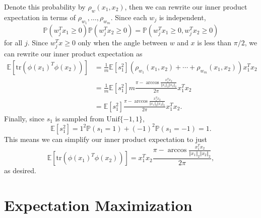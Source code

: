 \documentclass{article}
\newcommand{\tr}{\text{tr}}
\begin{document}
Denote this probability by $\rho_w(x_1,x_2)$, then we can rewrite our inner product expectation in terms of $\rho_{w_1}, \dots, \rho_{w_m}$. Since each $w_j$ is independent, \[\mathbb{P}(w_j^T x_1\geq 0) \mathbb{P}(w_j^Tx_2\geq 0) = \mathbb{P}(w_j^T x_1 \geq 0, w_j^T x_2 \geq 0)\] for all $j$. Since $w_j^T x \geq 0$ only when the angle between $w$ and $x$ is less than $\pi/2$, we can rewrite our inner product expectation as
\begin{align*}
	\mathbb{E}\left[ \tr(\phi(x_1)^T \phi(x_2)) \right] &= \frac{1}{m} \mathbb{E}[s_1^2] \left( \rho_{w_1}(x_1,x_2) + \cdots + \rho_{w_m}(x_1,x_2) \right) x_1^T x_2 \\
							    &= \frac{1}{m} \mathbb{E}[s_1^2]m \frac{\pi - \arccos \frac{x_1^T x_2}{\Vert{x_1}\Vert_2 \Vert{x_2}\Vert_2}}{2\pi} x_1^T x_2 \\
							    &= \mathbb{E}[s_1^2] \frac{\pi - \arccos \frac{x_1^T x_2}{\Vert{x_1}\Vert_2 \Vert{x_2}\Vert_2}}{2\pi} x_1^T x_2.
\end{align*}
Finally, since $s_1$ is sampled from $\text{Unif}\{-1, 1\}$,
\[
	\mathbb{E}[s_1^2] = 1^2 \mathbb{P}(s_1=1) + (-1)^2 \mathbb{P}(s_1=-1) = 1.
\] This means we can simplify our inner product expectation to just
\[
\mathbb{E}\left[ \tr(\phi(x_1)^T \phi(x_2)) \right] = x_1^T x_2 \frac{\pi - \arccos \frac{x_1^T x_2}{\Vert{x_1}\Vert_2 \Vert{x_2}\Vert_2}}{2\pi},
\] as desired.



\section{Expectation Maximization}
\end{document}

